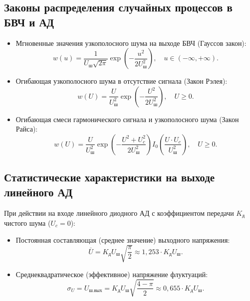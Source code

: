 \documentclass[12pt,a4paper]{article}
\begin{document}
\subsection{Законы распределения случайных процессов в БВЧ и АД}
\begin{itemize}
    \item Мгновенные значения узкополосного шума на выходе БВЧ (Гауссов закон):
    \begin{equation}
    w(u) = \frac{1}{U_{\text{ш}} \sqrt{2\pi}} \exp\left(-\frac{u^2}{2 U_{\text{ш}}^2}\right), \quad u \in (-\infty, +\infty).
    \end{equation}
    \item Огибающая узкополосного шума в отсутствие сигнала (Закон Рэлея):
    \begin{equation}
    w(U) = \frac{U}{U_{\text{ш}}^2} \exp\left(-\frac{U^2}{2 U_{\text{ш}}^2}\right), \quad U \ge 0.
    \end{equation}
    \item Огибающая смеси гармонического сигнала и узкополосного шума (Закон Райса):
    \begin{equation}
    w(U) = \frac{U}{U_{\text{ш}}^2} \exp\left(-\frac{U^2 + U_c^2}{2 U_{\text{ш}}^2}\right) I_0\left(\frac{U \cdot U_c}{U_{\text{ш}}^2}\right), \quad U \ge 0.
    \end{equation}
\end{itemize}

\subsection{Статистические характеристики на выходе линейного АД}
При действии на входе линейного диодного АД с коэффициентом передачи $K_{\text{д}}$ чистого шума ($U_c = 0$):
\begin{itemize}
    \item Постоянная составляющая (среднее значение) выходного напряжения:
    \begin{equation}
    \overline{U} = K_{\text{д}} U_{\text{ш}} \sqrt{\frac{\pi}{2}} \approx 1{,}253 \cdot K_{\text{д}} U_{\text{ш}}.
    \end{equation}
    \item Среднеквадратическое (эффективное) напряжение флуктуаций:
    \begin{equation}
    \sigma_U = U_{\text{ш.вых}} = K_{\text{д}} U_{\text{ш}} \sqrt{\frac{4 - \pi}{2}} \approx 0{,}655 \cdot K_{\text{д}} U_{\text{ш}}.
    \end{equation}
\end{itemize}
\end{document}

